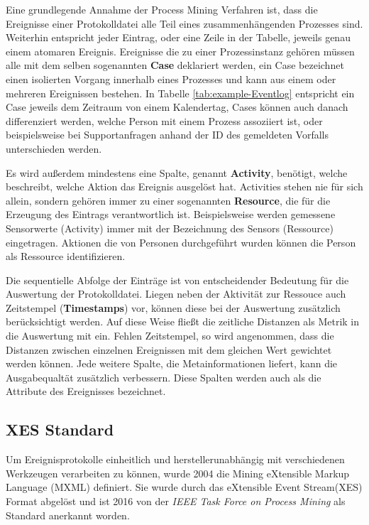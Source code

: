 Eine grundlegende Annahme der Process Mining Verfahren ist, dass die Ereignisse einer Protokolldatei alle Teil eines zusammenhängenden Prozesses sind. Weiterhin entspricht jeder Eintrag, oder eine Zeile in der Tabelle, jeweils genau einem atomaren Ereignis. Ereignisse die zu einer Prozessinstanz gehören müssen alle mit dem selben sogenannten \textbf{Case} deklariert werden, ein Case bezeichnet einen isolierten Vorgang innerhalb eines Prozesses und kann aus einem oder mehreren Ereignissen bestehen. In Tabelle \ref{tab:example-Eventlog} entspricht ein Case jeweils dem Zeitraum von einem Kalendertag, Cases können auch danach differenziert werden, welche Person mit einem Prozess assoziiert ist, oder beispielsweise bei Supportanfragen anhand der ID des gemeldeten Vorfalls unterschieden werden.

Es wird außerdem mindestens eine Spalte, genannt \textbf{Activity}, benötigt, welche beschreibt, welche Aktion das Ereignis ausgelöst hat. Activities stehen nie für sich allein,  sondern gehören immer zu einer sogenannten \textbf{Resource}, die für die Erzeugung des Eintrags verantwortlich ist. Beispielsweise werden gemessene Sensorwerte (Activity) immer mit der Bezeichnung des Sensors (Ressource) eingetragen. Aktionen die von Personen durchgeführt wurden können die Person als Ressource identifizieren.

Die sequentielle Abfolge der Einträge ist von entscheidender Bedeutung für die Auswertung der Protokolldatei. Liegen neben der Aktivität zur Ressouce auch Zeitstempel (\textbf{Timestamps}) vor, können diese bei der Auswertung zusätzlich berücksichtigt werden. Auf diese Weise fließt die zeitliche Distanzen als Metrik in die Auswertung mit ein. Fehlen Zeitstempel, so wird angenommen, dass die Distanzen zwischen einzelnen Ereignissen mit dem gleichen Wert gewichtet werden können.
Jede weitere Spalte, die Metainformationen liefert, kann die Ausgabequaltät zusätzlich verbessern. Diese Spalten werden auch als die Attribute des Ereignisses bezeichnet. 
\newpage
\subsection{XES Standard}\label{sec:xes}
Um Ereignisprotokolle einheitlich und herstellerunabhängig mit verschiedenen Werkzeugen verarbeiten zu können, wurde 2004 die Mining eXtensible Markup Language (MXML) definiert. Sie wurde durch das eXtensible Event Stream(XES) Format abgelöst \cite{xesmxml} und ist 2016 von der \textit{IEEE Task Force on Process Mining} als Standard anerkannt worden. 

